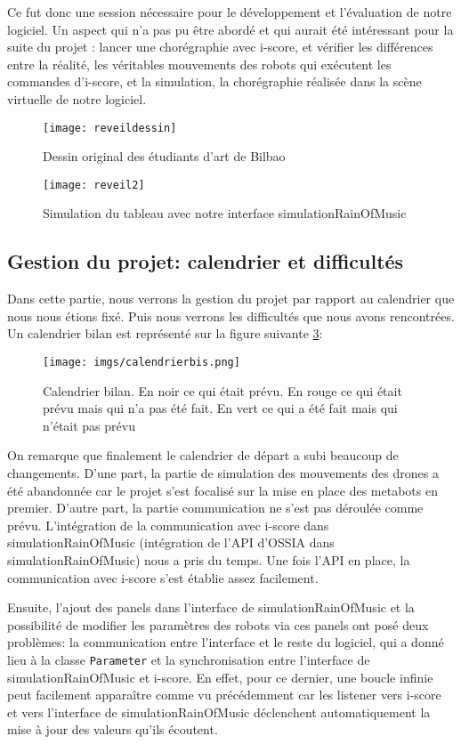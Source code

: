 Ce fut donc une session nécessaire pour le développement et l'évaluation de notre logiciel. Un aspect qui n'a pas pu être abordé et qui aurait été intéressant pour la suite du projet : lancer une chorégraphie avec i-score, et vérifier les différences entre la réalité, les véritables mouvements des robots qui exécutent les commandes d'i-score, et la simulation, la chorégraphie réalisée dans la scène virtuelle de notre logiciel.

\begin{figure}[H]
\centering
\texttt{[image: reveildessin]}
\caption{Dessin original des étudiants d'art de Bilbao}
\label{chore}
\end{figure}


\begin{figure} [H]
\centering
\texttt{[image: reveil2]}
\caption{Simulation du tableau avec notre interface simulationRainOfMusic}
\label{reveil}
\end{figure}


\subsection{Gestion du projet: calendrier et difficultés}

Dans cette partie, nous verrons la gestion du projet par rapport au calendrier que nous nous étions fixé. Puis nous verrons les difficultés que nous avons rencontrées. Un calendrier bilan est représenté sur la figure suivante \ref{cal}:

\begin{figure}[H]
  \begin{center}
  	\texttt{[image: imgs/calendrierbis.png]}
  	\caption{Calendrier bilan. En noir ce qui était prévu. En rouge ce qui était prévu mais qui n'a pas été fait. En vert ce qui a été fait mais qui n'était pas prévu}
  	\label{cal}
  \end{center}
\end{figure}

On remarque que finalement le calendrier de départ a subi beaucoup de changements. D'une part, la partie de simulation des mouvements des drones a été abandonnée car le projet s'est focalisé sur la mise en place des metabots en premier. D'autre part, la partie communication ne s'est pas déroulée comme prévu. L'intégration de la communication avec i-score dans simulationRainOfMusic (intégration de l'API d'OSSIA dans simulationRainOfMusic) nous a pris du temps. Une fois l'API en place, la communication avec i-score s'est établie assez facilement. 

Ensuite, l'ajout des panels dans l'interface de simulationRainOfMusic et la possibilité de modifier les paramètres des robots via ces panels ont posé deux problèmes: la communication entre l'interface et le reste du logiciel, qui a donné lieu à la classe \verb|Parameter| et la synchronisation entre l'interface de simulationRainOfMusic et i-score. En effet, pour ce dernier, une boucle infinie peut facilement apparaître comme vu précédemment car les listener vers i-score et vers l'interface de simulationRainOfMusic déclenchent automatiquement la mise à jour des valeurs qu'ils écoutent. 

